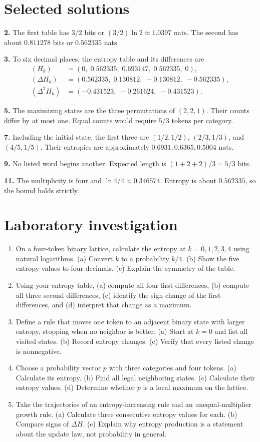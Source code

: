 \documentclass[11pt,oneside,openany]{book}
\theoremstyle{definition}
\theoremstyle{remark}
\numberwithin{equation}{chapter}
\providecommand{\tightlist}{\setlength{\itemsep}{0pt}\setlength{\parskip}{0pt}}
\newcommand{\labheading}{\FloatBarrier\section*{Laboratory investigation}\addcontentsline{toc}{section}{Laboratory investigation}}
\begin{document}
\section{Selected solutions}\label{ch05-selected-solutions}

\textbf{2.} The first table has \(3/2\) bits or \((3/2)\ln2\approx1.0397\) nats. The second has about \(0.811278\) bits or \(0.562335\) nats.

\textbf{3.} To six decimal places, the entropy table and its differences are \[\begin{aligned}
(H_k)&=(0,\;0.562335,\;0.693147,\;0.562335,\;0),\\
(\Delta H_k)&=(0.562335,\;0.130812,\;-0.130812,\;-0.562335),\\
(\Delta^2H_k)&=(-0.431523,\;-0.261624,\;-0.431523).
\end{aligned}\]

\textbf{5.} The maximizing states are the three permutations of \((2,2,1)\). Their counts differ by at most one. Equal counts would require \(5/3\) tokens per category.

\textbf{7.} Including the initial state, the first three are \((1/2,1/2)\), \((2/3,1/3)\), and \((4/5,1/5)\). Their entropies are approximately \(0.6931,0.6365,0.5004\) nats.

\textbf{9.} No listed word begins another. Expected length is \((1+2+2)/3=5/3\) bits.

\textbf{11.} The multiplicity is four and \(\ln4/4\approx0.346574\). Entropy is about \(0.562335\), so the bound holds strictly.
\labheading\begin{enumerate}
\def\labelenumi{\arabic{enumi}.}
\tightlist
\item
  On a four-token binary lattice, calculate the entropy at \(k=0,1,2,3,4\) using natural logarithms. (a) Convert \(k\) to a probability \(k/4\). (b) Show the five entropy values to four decimals. (c) Explain the symmetry of the table.
\item
  Using your entropy table, (a) compute all four first differences, (b) compute all three second differences, (c) identify the sign change of the first differences, and (d) interpret that change as a maximum.
\item
  Define a rule that moves one token to an adjacent binary state with larger entropy, stopping when no neighbor is better. (a) Start at \(k=0\) and list all visited states. (b) Record entropy changes. (c) Verify that every listed change is nonnegative.
\item
  Choose a probability vector \(p\) with three categories and four tokens. (a) Calculate its entropy. (b) Find all legal neighboring states. (c) Calculate their entropy values. (d) Determine whether \(p\) is a local maximum on the lattice.
\item
  Take the trajectories of an entropy-increasing rule and an unequal-multiplier growth rule. (a) Calculate three consecutive entropy values for each. (b) Compare signs of \(\Delta H\). (c) Explain why entropy production is a statement about the update law, not probability in general.
\end{enumerate}
\end{document}
